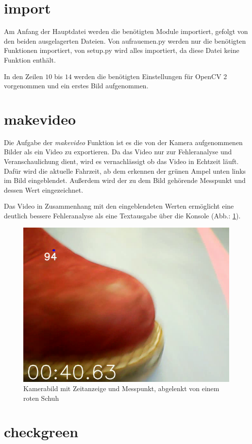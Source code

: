 \documentclass[a4paper, 12pt]{scrartcl}
\begin{document}
\section{import}


Am Anfang der Hauptdatei werden die benötigten Module importiert, gefolgt von den beiden ausgelagerten Dateien. Von aufrauemen.py werden nur die benötigten Funktionen importiert, von setup.py wird alles importiert, da diese Datei keine Funktion enthält.

In den Zeilen $10$ bis $14$ werden die benötigten Einstellungen für OpenCV 2 vorgenommen und ein erstes Bild aufgenommen.

\section{makevideo}


Die Aufgabe der \textit{makevideo} Funktion ist es die von der Kamera aufgenommenen Bilder als ein Video zu exportieren. Da das Video nur zur Fehleranalyse und Veranschaulichung dient, wird es vernachlässigt ob das Video in Echtzeit läuft. Dafür wird die aktuelle Fahrzeit, ab dem erkennen der grünen Ampel unten links im Bild eingeblendet. Außerdem wird der zu dem Bild gehörende Messpunkt und dessen Wert eingezeichnet.

Das Video in Zusammenhang mit den eingeblendeten Werten ermöglicht eine deutlich bessere Fehleranalyse als eine Textausgabe über die Konsole (Abb.: \ref{schuh_im_bild}).

\begin{figure}[ht!] \centering
	\includegraphics[width=.5\textwidth]{schuh_im_bild.png}
	\caption{Kamerabild mit Zeitanzeige und Messpunkt, abgelenkt von einem roten Schuh}
	\label{schuh_im_bild}
\end{figure}

\section{checkgreen}

\end{document}
